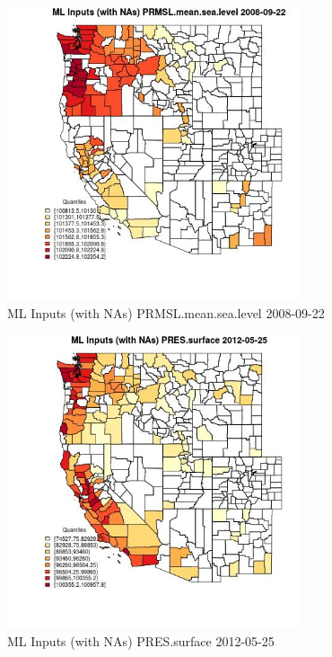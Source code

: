 \begin{figure} 
\centering  
\includegraphics[width=0.77\textwidth]{Code_Outputs/Report_ML_input_PM25_Step4_part_e_de_duplicated_aves_compiled_2019-05-18wNAs_CountyPRMSLmeansealevelMean2008-09-22_2008-09-22.jpg} 
\caption{\label{fig:Report_ML_input_PM25_Step4_part_e_de_duplicated_aves_compiled_2019-05-18wNAsCountyPRMSLmeansealevelMean2008-09-22_2008-09-22}ML Inputs (with NAs) PRMSL.mean.sea.level 2008-09-22} 
\end{figure} 
 

\begin{figure} 
\centering  
\includegraphics[width=0.77\textwidth]{Code_Outputs/Report_ML_input_PM25_Step4_part_e_de_duplicated_aves_compiled_2019-05-18wNAs_CountyPRESsurfaceMean2012-05-25_2012-05-25.jpg} 
\caption{\label{fig:Report_ML_input_PM25_Step4_part_e_de_duplicated_aves_compiled_2019-05-18wNAsCountyPRESsurfaceMean2012-05-25_2012-05-25}ML Inputs (with NAs) PRES.surface 2012-05-25} 
\end{figure} 
 

